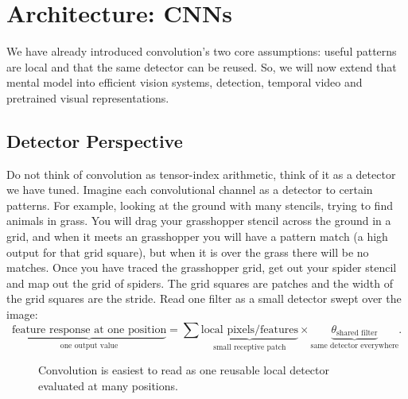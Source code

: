 \chapter{Architecture: CNNs}
\label{chap:cnn}
We have already introduced convolution's two core assumptions: useful patterns are local and that the same detector can be reused.
So, we will now extend that mental model into efficient vision systems, detection, temporal video and pretrained visual representations.

\section{Detector Perspective}
\label{sec:cnn-local-detectors}
Do not think of convolution as tensor-index arithmetic, think of it as a detector we have tuned.
Imagine each convolutional channel as a detector to certain patterns. 
For example, looking at the ground with many stencils, trying to find animals in grass.
You will drag your grasshopper stencil across the ground in a grid, and when it meets an grasshopper you will have a pattern match (a high output for that grid square), but when it is over the grass there will be no matches.
Once you have traced the grasshopper grid, get out your spider stencil and map out the grid of spiders.
The grid squares are patches and the width of the grid squares are the stride.
Read one filter as a small detector swept over the image:
\[
    \underbrace{\text{feature response at one position}}_{\text{one output value}}
    =
    \sum
    \underbrace{\text{local pixels/features}}_{\text{small receptive patch}}
    \times
    \underbrace{\theta_{\text{shared filter}}}_{\text{same detector everywhere}}.
\]

\begin{figure}[htbp]
    \centering
    \caption{Convolution is easiest to read as one reusable local detector evaluated at many positions.}
\end{figure}

